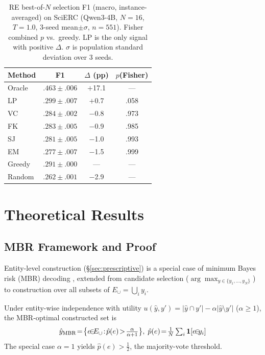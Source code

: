 \begin{table}[t]
\centering
\small
\caption{RE best-of-$N$ selection F1 (macro, instance-averaged) on SciERC (Qwen3-4B, $N{=}16$, $T{=}1.0$, 3-seed mean${\pm}\sigma$, $n{=}551$). Fisher combined $p$ vs.\ greedy. LP is the only signal with positive $\Delta$. $\sigma$ is population standard deviation over 3 seeds.}
\label{tab:re_n16_selection}
\begin{tabular}{lccc}
\toprule
Method & F1 & $\Delta$ (pp) & $p$(Fisher) \\
\midrule
Oracle & $.463{\pm}.006$ & $+$17.1 & --- \\
\midrule
LP & $\mathbf{.299}{\pm}.007$ & $+$0.7 & .058 \\
VC & $.284{\pm}.002$ & $-$0.8 & .973 \\
FK & $.283{\pm}.005$ & $-$0.9 & .985 \\
SJ & $.281{\pm}.005$ & $-$1.0 & .993 \\
EM & $.277{\pm}.007$ & $-$1.5 & .999 \\
\midrule
Greedy & $.291{\pm}.000$ & --- & --- \\
Random & $.262{\pm}.001$ & $-$2.9 & --- \\
\bottomrule
\end{tabular}
\end{table}

\section{Theoretical Results}\label{app:mbr_discussion}

\subsection{MBR Framework and Proof}\label{app:mbr_proof}

Entity-level construction (\S\ref{sec:prescriptive}) is a special case of minimum Bayes risk (MBR) decoding \cite{kumar2004minimum, eikema2020map}, extended from candidate selection ($\arg\max_{y \in \{y_1,\ldots,y_N\}}$) to construction over all subsets of $E_\cup{=}\bigcup_i y_i$.

\begin{proposition}\label{prop:construction_mbr}
Under entity-wise independence with utility $u(\hat{y}, y') = |\hat{y} \cap y'| - \alpha|\hat{y} \setminus y'|$ ($\alpha \geq 1$), the MBR-optimal constructed set is
\begin{equation}\label{eq:mbr_construction}
\hat{y}_{\textup{MBR}} \!=\! \bigl\{e \!{\in}\! E_\cup \!:\! \hat{p}(e) \!>\! \tfrac{\alpha}{\alpha{+}1}\bigr\},\; \hat{p}(e) \!=\! \tfrac{1}{N} \textstyle\sum\nolimits_{i} \mathbf{1}[e \!{\in}\! y_i]
\end{equation}
The special case $\alpha{=}1$ yields $\hat{p}(e) > \tfrac{1}{2}$, the majority-vote threshold.
\end{proposition}

